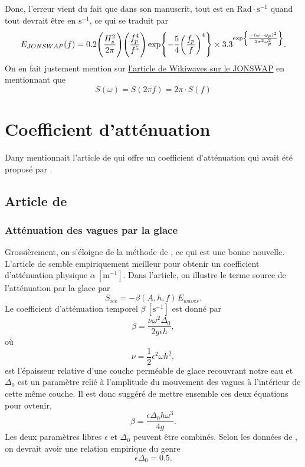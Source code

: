 \documentclass[10pt]{article}
\numberwithin{equation}{section}
\newcommand{\venti}{\vphantom{\sum_x^x}}
\newcommand{\pt}{\hspace{1pt}} %
\begin{document}
Donc, l'erreur vient du fait que dans son manuscrit, tout est en \(\mathrm{Rad}\cdot\mathrm{s}^{-1}\) quand tout devrait être en \(\mathrm{s}^{-1}\), ce qui se traduit par
\begin{equation}
   E_{JONSWAP}(f) = 0.2\qty(\venti\frac{H_s^2}{2\pi}) \qty(\frac{f^4_p}{f^5}) \exp{-\frac{5}{4}\qty(\frac{f_p}{f})^4} \times 3.3^{\exp{\frac{-(\omega-\omega_p)^2}{2\sigma^2 \omega_p^2}}}.
\end{equation}
On en fait justement mention sur \href{https://wikiwaves.org/Ocean-Wave\_Spectra}{l'article de Wikiwaves sur le JONSWAP} en mentionnant que
\begin{equation}
   S(\omega) = S(2\pi f) = 2\pi\cdot S(f)
\end{equation}
\section{Coefficient d'atténuation}
\label{sec:orge769e47}

Dany mentionnait l'article de \Textcite{auclair2022model} qui offre un coefficient d'atténuation qui avait été proposé par \Textcite{sutherland2019two}.
\subsection{Article de \Textcite{auclair2022model}}
\label{sec:orgd2a6075}


\subsubsection{Atténuation des vagues par la glace}
\label{sec:orgc36c9b6}
Grossièrement, on s'éloigne de la méthode de \Textcite{Kohout2011wave}, ce qui est une bonne nouvelle.
L'article de \Textcite{sutherland2019two} semble empiriquement meilleur pour obtenir un coefficient d'atténuation physique \(\alpha\ [\mathrm{m}^{-1}]\).
Dans l'article, on illustre le terme source de l'atténuation par la glace par
\begin{equation}
   S_{ice} = - \beta(A,h,f)\pt E_{waves}.
\end{equation}
Le coefficient d'atténuation temporel \(\beta\ [\mathrm{s}^{-1}]\) est donné par 
\begin{equation}
   \beta = \frac{\nu \omega^2 \Delta_0}{2g\epsilon h},
\end{equation}
où
\begin{equation}
   \nu = \frac{1}{2} \epsilon^2 \omega h^2,
\end{equation}
est l'épaisseur relative d'une couche perméable de glace recouvrant notre eau et \(\Delta_0\) est un paramètre relié à l'amplitude du mouvement des vagues à l'intérieur de cette même couche.
Il est donc suggéré de mettre ensemble ces deux équations pour ovtenir,
\begin{equation}
   \beta = \frac{\epsilon \Delta_0 h \omega^3}{4g}.
\end{equation}
Les deux paramètres libres \(\epsilon\) et \(\Delta_0\) peuvent être combinés.
Selon les données de \Textcite{sutherland2019two}, on devrait avoir une relation empirique du genre
\begin{equation}
   \epsilon \Delta_0 = 0.5.
\end{equation}
\end{document}
